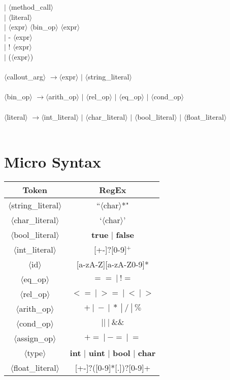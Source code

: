 \documentclass{article}
\newcommand{\angl}[1]{$\langle$#1$\rangle$}
\newcommand{\lra}[0]{$\longrightarrow$}
\begin{document}
\begin{tabbing}
\> $|$ \angl{method\_call} \\
\> $|$ \angl{literal} \\
\> $|$ \angl{expr} \angl{bin\_op} \angl{expr} \\
\> $|$ - \angl{expr} \\
\> $|$ ! \angl{expr} \\
\> $|$ (\angl{expr}) \\ \\
\angl{callout\_arg} \lra \angl{expr} $|$ \angl{string\_literal} \\ \\
\angl{bin\_op} \lra \angl{arith\_op} $|$ \angl{rel\_op} $|$ \angl{eq\_op} $|$ \angl{cond\_op} \\ \\
\angl{literal} \lra \angl{int\_literal} $|$ \angl{char\_literal} $|$ \angl{bool\_literal} $|$ \angl{float\_literal} \\ \\
\end{tabbing}

\section{Micro Syntax}

\begin{tabular}{|c|c|} \hline
Token & RegEx \\ \hline
\angl{string\_literal} & ``\angl{char}*"  \\ \hline
\angl{char\_literal} & `\angl{char}'  \\ \hline
\angl{bool\_literal} & \textbf{true} $|$ \textbf{false}  \\ \hline
\angl{int\_literal} & [+-]?[0-9]$^+$  \\ \hline
\angl{id} & [a-zA-Z][a-zA-Z0-9]*  \\ \hline
\angl{eq\_op} & $ ==\ |\ !=$  \\ \hline
\angl{rel\_op} & $<=\ |\ >=\ |\ <\ |\ >$  \\ \hline
\angl{arith\_op} & $+\ |\ -\ |\ *\ |\ /\ |\ \%$  \\ \hline
\angl{cond\_op} & $||\ |\ \&\&$ \\ \hline
\angl{assign\_op} & $+=\ |\ -=\ |\ =$  \\ \hline
\angl{type} & \textbf{int} $|$ \textbf{uint} $|$ \textbf{bool} $|$ \textbf{char}  \\ \hline
\angl{float\_literal} & [+-]?([0-9]*[.])?[0-9]+ \\ \hline
\end{tabular}
\end{document}
